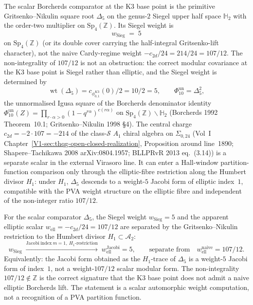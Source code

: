 \begin{remark}
\label{rem:mpvaq-siegel-weight}
The scalar Borcherds comparator at the K3 base point is the primitive
Gritsenko--Nikulin square root $\Delta_5$ on the genus-$2$ Siegel upper
half space $\mathbb H_2$ with the order-two multiplier on
$\mathrm{Sp}_4(\mathbb Z)$.  Its Siegel weight is
\[
w_{\mathrm{Sieg}} \;=\; 5
\]
on $\mathrm{Sp}_4(\mathbb Z)$ (or its double cover carrying the
half-integral Gritsenko-lift character), not the naive Cardy-regime
weight $-c_{2d}/24 = 214/24 = 107/12$. The non-integrality of
$107/12$ is not an obstruction: the correct modular covariance at
the K3 base point is Siegel rather than elliptic, and the Siegel
weight is determined by
\[
 \operatorname{wt}(\Delta_5)
 =c_{\phi_{0,1}^{K3}}(0)/2=10/2=5,
 \qquad
 \Phi_{10}^{\mathrm{un}}=\Delta_5^2,
\]
the unnormalised Igusa square of the Borcherds denominator
identity $\Phi_{10}^{\mathrm{un}}(Z) = \prod_{r\cdot\alpha > 0}(1-q^{r\alpha})^{c(r\alpha)}$
on $\mathrm{Sp}_4(\mathbb Z)\backslash\mathbb H_2$ (Borcherds 1992
Theorem~10.1; Gritsenko--Nikulin 1998 \S 4). The central charge
$c_{2d} = -2\cdot 107 = -214$ of the class-$\mathcal S$ $A_1$
chiral algebra on $\Sigma_{0,24}$ (Vol~I
Chapter~\ref{V1-sec:thqg-open-closed-realization}, Proposition around
line~1890; Shapere--Tachikawa 2008 arXiv:0804.1957; BLLPRvR 2013
eq.~(3.14)) is a separate scalar in the external Virasoro line. It can
enter a Hall-window partition-function comparison only through the
elliptic-fibre restriction along the Humbert divisor $H_1$: under
$H_1$, $\Delta_5$ descends to a weight-$5$ Jacobi form of elliptic
index~$1$, compatible with the PVA weight structure on the elliptic
fibre and independent of the non-integer ratio $107/12$.
\end{remark}

\begin{proposition}[Scalar Siegel-vs-elliptic weight matching at $c_{2d} = -214$]
\label{prop:mpvaq-siegel-vs-elliptic}
For the scalar comparator $\Delta_5$, the Siegel weight
$w_{\mathrm{Sieg}} = 5$ and the apparent elliptic scalar
$w_{\mathrm{ell}} = -c_{2d}/24 = 107/12$ are separated by the
Gritsenko--Nikulin restriction to the Humbert divisor
$H_1 \subset \mathcal A_2$:
\[
w_{\mathrm{Sieg}}
\;\xrightarrow{\mathrm{Jacobi\ index\ }m = 1,\ H_1\text{-restriction}}\;
w_{\mathrm{ell}}^{\mathrm{Jacobi}} = 5,
\qquad
\text{separate from}
\quad
w_{\mathrm{ell}}^{\mathrm{naive}} = 107/12.
\]
Equivalently: the Jacobi form obtained as the $H_1$-trace of
$\Delta_5$ is a weight-$5$ Jacobi form of index~$1$, not a
weight-$107/12$ scalar modular form. The non-integrality
$107/12 \notin \mathbb Z$ is the correct signature that the K3
base point does not admit a naive elliptic Borcherds lift. The
statement is a scalar automorphic weight computation, not a recognition
of a PVA partition function.
\end{proposition}

